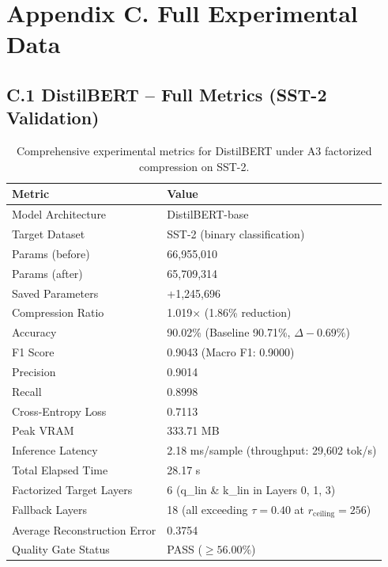 \section{Appendix C. Full Experimental Data}

\subsection{C.1 DistilBERT -- Full Metrics (SST-2 Validation)}

\begin{table}[H]
\centering
\small
\begin{tabular}{ll}
\toprule
\textbf{Metric} & \textbf{Value} \\
\midrule
Model Architecture & DistilBERT-base \\
Target Dataset & SST-2 (binary classification) \\
Params (before) & 66,955,010 \\
Params (after) & 65,709,314 \\
Saved Parameters & +1,245,696 \\
Compression Ratio & 1.019$\times$ (1.86\% reduction) \\
Accuracy & 90.02\% (Baseline 90.71\%, $\Delta -0.69\%$) \\
F1 Score & 0.9043 (Macro F1: 0.9000) \\
Precision & 0.9014 \\
Recall & 0.8998 \\
Cross-Entropy Loss & 0.7113 \\
Peak VRAM & 333.71 MB \\
Inference Latency & 2.18 ms/sample (throughput: 29,602 tok/s) \\
Total Elapsed Time & 28.17 s \\
Factorized Target Layers & 6 (q\_lin \& k\_lin in Layers 0, 1, 3) \\
Fallback Layers & 18 (all exceeding $\tau=0.40$ at $r_{\mathrm{ceiling}}=256$) \\
Average Reconstruction Error & 0.3754 \\
Quality Gate Status & PASS ($\ge 56.00\%$) \\
\bottomrule
\end{tabular}
\caption{Comprehensive experimental metrics for DistilBERT under A3 factorized compression on SST-2.}
\label{tab:distilbert_full_metrics}
\end{table}


